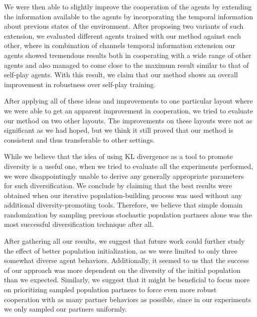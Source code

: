 We were then able to slightly improve the cooperation of the agents by extending the information available to the agents by incorporating the temporal information about previous states of the environment.
After proposing two variants of such extension, we evaluated different agents trained with our method against each other, where in combination of channels temporal information extension our agents showed tremendous results both in cooperating with a wide range of other agents and also managed to come close to the maximum result similar to that of self-play agents.
With this result, we claim that our method shows an overall improvement in robustness over self-play training.

After applying all of these ideas and improvements to one particular layout where we were able to get an apparent improvement in cooperation, we tried to evaluate our method on two other layouts.
The improvements on these layouts were not as significant as we had hoped, but we think it still proved that our method is consistent and thus transferable to other settings.

While we believe that the idea of using KL divergence as a tool to promote diversity is a useful one, when we tried to evaluate all the experiments performed, we were disappointingly unable to derive any generally appropriate parameters for such diversification.
We conclude by claiming that the best results were obtained when our iterative population-building process was used without any additional diversity-promoting tools.
Therefore, we believe that simple domain randomization by sampling previous stochastic population partners alone was the most successful diversification technique after all.

After gathering all our results, we suggest that future work could further study the effect of better population initialization, as we were limited to only three somewhat diverse agent behaviors.
Additionally, it seemed to us that the success of our approach was more dependent on the diversity of the initial population than we expected.
Similarly, we suggest that it might be beneficial to focus more on prioritizing sampled population partners to force even more robust cooperation with as many partner behaviors as possible, since in our experiments we only sampled our partners uniformly.


